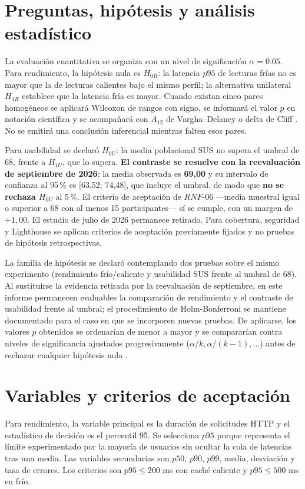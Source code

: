 \documentclass[11pt,a4paper]{report}
\begin{document}
\section{Preguntas, hipótesis y análisis estadístico}
La evaluación cuantitativa se organiza con un nivel de significación $\alpha=0.05$. Para rendimiento, la hipótesis nula es $H_{0R}$: la latencia $p95$ de lecturas frías no es mayor que la de lecturas calientes bajo el mismo perfil; la alternativa unilateral $H_{1R}$ establece que la latencia fría es mayor. Cuando existan cinco pares homogéneos se aplicará Wilcoxon de rangos con signo, se informará el valor $p$ en notación científica y se acompañará con $A_{12}$ de Vargha--Delaney o delta de Cliff \cite{arcuri2012hitchhiker,vargha2000critique,cliff1993dominance}. No se emitirá una conclusión inferencial mientras falten esos pares.

Para usabilidad se declaró $H_{0U}$: la media poblacional SUS no supera el umbral de 68, frente a $H_{1U}$, que lo supera. \textbf{El contraste se resuelve con la reevaluación de septiembre de 2026}: la media observada es \textbf{69,00} y su intervalo de confianza al 95\,\% es [63,52; 74,48], que incluye el umbral, de modo que \textbf{no se rechaza $H_{0U}$} al 5\,\%. El criterio de aceptación de $RNF\text{-}06$ —media muestral igual o superior a 68 con al menos 15 participantes— sí se cumple, con un margen de $+1,00$. El estudio de julio de 2026 permanece retirado. Para cobertura, seguridad y Lighthouse se aplican criterios de aceptación previamente fijados y no pruebas de hipótesis retrospectivas.

La familia de hipótesis se declaró contemplando dos pruebas sobre el mismo experimento (rendimiento frío/caliente y usabilidad SUS frente al umbral de 68). Al sustituirse la evidencia retirada por la reevaluación de septiembre, en este informe permanecen evaluables la comparación de rendimiento y el contraste de usabilidad frente al umbral; el procedimiento de Holm-Bonferroni se mantiene documentado para el caso en que se incorporen nuevas pruebas. De aplicarse, los valores $p$ obtenidos se ordenarían de menor a mayor y se compararían contra niveles de significancia ajustados progresivamente ($\alpha / k, \alpha / (k-1), \dots$) antes de rechazar cualquier hipótesis nula \cite{holm1979simple}.

\section{Variables y criterios de aceptación}
Para rendimiento, la variable principal es la duración de solicitudes HTTP y el estadístico de decisión es el percentil 95. Se selecciona $p95$ porque representa el límite experimentado por la mayoría de usuarios sin ocultar la cola de latencias tras una media. Las variables secundarias son $p50$, $p90$, $p99$, media, desviación y tasa de errores. Los criterios son $p95 \le 200$ ms con caché caliente y $p95 \le 500$ ms en frío.
\end{document}
